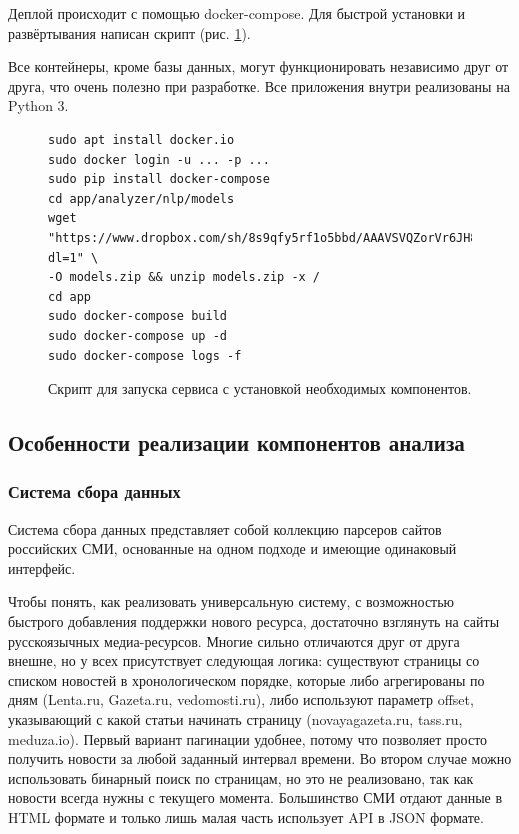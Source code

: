 \documentclass[a4paper, 14pt]{extarticle}
\begin{document}
Деплой происходит с помощью docker-compose. Для быстрой установки и развёртывания написан скрипт (рис. \ref{bash}).

Все контейнеры, кроме базы данных, могут функционировать независимо друг от друга, что очень полезно при разработке. Все приложения внутри реализованы на Python 3.

\begin{figure}
	\centering
\begin{verbatim}
sudo apt install docker.io
sudo docker login -u ... -p ...
sudo pip install docker-compose
cd app/analyzer/nlp/models
wget "https://www.dropbox.com/sh/8s9qfy5rf1o5bbd/AAAVSVQZorVr6JH8LPJQX9tva?dl=1" \
-O models.zip && unzip models.zip -x /
cd app
sudo docker-compose build
sudo docker-compose up -d
sudo docker-compose logs -f
\end{verbatim}
	\caption{Скрипт для запуска сервиса с установкой необходимых компонентов.}
	\label{bash}
\end{figure}


\subsection{Особенности реализации компонентов анализа}
\subsubsection{Система сбора данных}

Система сбора данных представляет собой коллекцию парсеров сайтов российских СМИ, основанные на одном подходе и имеющие одинаковый интерфейс.

Чтобы понять, как реализовать универсальную систему, с возможностью быстрого добавления поддержки нового ресурса, достаточно взглянуть на сайты русскоязычных медиа-ресурсов. Многие сильно отличаются друг от друга внешне, но у всех присутствует следующая логика: существуют страницы со списком новостей в хронологическом порядке, которые либо агрегированы по дням (Lenta.ru, Gazeta.ru, vedomosti.ru), либо используют параметр offset, указывающий с какой статьи начинать страницу (novayagazeta.ru, tass.ru, meduza.io). Первый вариант пагинации удобнее, потому что позволяет просто получить новости за любой заданный интервал времени. Во втором случае можно использовать бинарный поиск по страницам, но это не реализовано, так как новости всегда нужны с текущего момента.
Большинство СМИ отдают данные в HTML формате и только лишь малая часть использует API в JSON формате.
\end{document}
